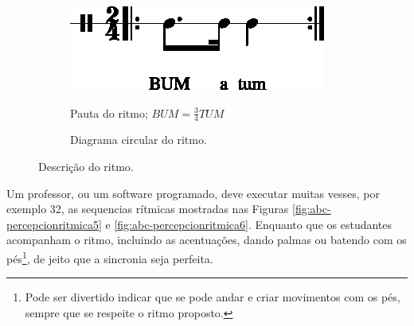 \begin{figure}[H]
\centering
     \begin{subfigure}[c]{0.45\textwidth}
         \centering
         \href{https://drive.google.com/file/d/1ZR0CPhwBYIp2TrqM8cAq_oyI3o-NZPbw/view?usp=sharing}{\includegraphics[width=\textwidth]{chapters/cap-musicalidade-percepcion/treino-ritmo4-1.eps}}
         \caption{Pauta do ritmo; $BUM=\frac{3}{4}TUM$}
         \label{fig:RitmoTUMatum1}
     \end{subfigure}
     \hfill
     \begin{subfigure}[c]{0.45\textwidth}
         \centering
{}
         \caption{Diagrama circular do ritmo.}
         \label{fig:RitmoTUMatum2}
     \end{subfigure}
\caption{Descrição do ritmo.}
\label{fig:abc-percepcionritmica4}
\end{figure}

\begin{example}
Um professor, ou um software programado, 
deve executar muitas vesses, por exemplo 32, 
as sequencias rítmicas mostradas nas Figuras 
\ref{fig:abc-percepcionritmica5} e \ref{fig:abc-percepcionritmica6}.
Enquanto que os estudantes acompanham o ritmo, 
incluindo as acentuações, dando palmas ou batendo com os pés\footnote{Pode
ser divertido indicar que se pode andar e criar movimentos com os pés, 
sempre que se respeite o ritmo proposto.},
de jeito que a sincronia seja perfeita.
\end{example}

